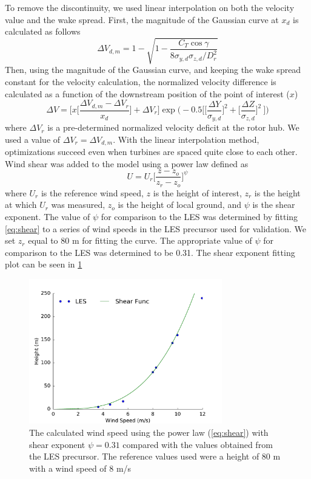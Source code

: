 \documentclass[conf]{new-aiaa}
\begin{document}
To remove the discontinuity, we used linear interpolation on both the velocity value and the wake spread. First, the magnitude of the Gaussian curve at $x_d$ is calculated as follows
%
\begin{equation}
	\Delta V_{d,m} = 1 - \sqrt{1 - \frac{C_T \cos{\gamma}}{8 \sigma_{y,d}  \sigma_{z,d}/D_r^2}}
\end{equation}
%
Then, using the magnitude of the Gaussian curve, and keeping the wake spread constant for the velocity calculation, the normalized velocity difference is calculated as a function of the downstream position of the point of interest ($x$)
\begin{equation}
	\Delta V = \bigg[x\bigg[\frac{\Delta V_{d,m} - \Delta V_r}{x_d}\bigg] + \Delta V_r\bigg]
        \exp{\bigg(-0.5  \bigg[\bigg[\frac{\Delta Y }{ \sigma_{y,d}}\bigg]^2+\bigg[\frac{\Delta Z }{ \sigma_{z,d}}\bigg]^2~\bigg]\bigg)}
\end{equation}
%
where $\Delta V_r$ is a pre-determined normalized velocity deficit at the rotor hub. We used a value of $\Delta V_r=\Delta V_{d,m}$. With the linear interpolation method, optimizations succeed even when turbines are spaced quite close to each other.
Wind shear was added to the model using a power law defined as
%
\begin{equation} \label{eq:shear}
	U = U_r\bigg[\frac{z-z_o}{z_r-z_o}\bigg]^\psi
\end{equation}
%
where $U_r$ is the reference wind speed, $z$ is the height of interest, $z_r$ is the height at which $U_r$ was measured, $z_o$ is the height of local ground, and $\psi$ is the shear exponent. The value of $\psi$ for comparison to the LES was determined by fitting \cref{eq:shear} to a series of wind speeds in the LES precursor used for validation. We set $z_r$ equal to 80 m for fitting the curve. The appropriate value of $\psi$ for comparison to the LES was determined to be 0.31.
The shear exponent fitting plot can be seen in \cref{fig:shear_fit}
%
\begin{figure}[ht]
	\centering
	\includegraphics[width=0.75\textwidth]{final_images/shear_fit.pdf}
	\caption{The calculated wind speed using the power law (\cref{eq:shear}) with shear exponent $\psi=0.31$ compared with the values obtained from the LES precursor. The reference values used were a height of 80 m with a wind speed of 8 m/s}
	\label{fig:shear_fit}
\end{figure}
%
\end{document}
